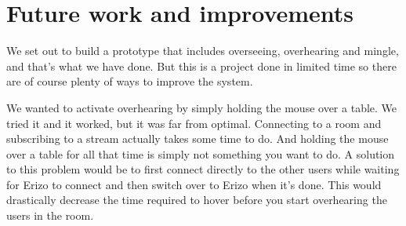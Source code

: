 \documentclass[12pt, titlepage]{article}
\begin{document}
\section{Future work and improvements}
We set out to build a prototype that includes overseeing, overhearing and mingle, and that's what we have done. But this is a project done in limited time so there are of course plenty of ways to improve the system.

We wanted to activate overhearing by simply holding the mouse over a table. We tried it and it worked, but it was far from optimal. Connecting to a room and subscribing to a stream actually takes some time to do. And holding the mouse over a table for all that time is simply not something you want to do. A solution to this problem would be to first connect directly to the other users while waiting for Erizo to connect and then switch over to Erizo when it's done. This would drastically decrease the time required to hover before you start overhearing the users in the room.
\end{document}
